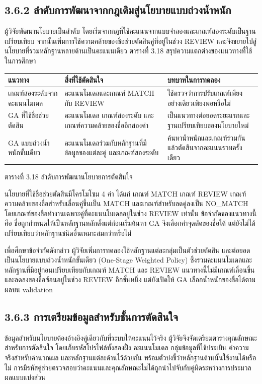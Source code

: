 \subsection*{3.6.2 ลำดับการพัฒนาจากกฎเดิมสู่นโยบายแบบถ่วงน้ำหนัก}
ผู้วิจัยพัฒนานโยบายเป็นลำดับ โดยเริ่มจากกฎที่ใช้คะแนนจากแบบจำลองและเกณฑ์สองระดับเป็นฐานเปรียบเทียบ จากนั้นเพิ่มการใช้ความคล้ายของชื่อช่วยตัดสินคู่ที่อยู่ในช่วง REVIEW และจึงขยายไปสู่นโยบายที่รวมหลักฐานหลายด้านเป็นคะแนนเดียว ตารางที่ 3.18 สรุปความแตกต่างของแนวทางที่ใช้ในการศึกษา

\begin{center}\small
\begin{tabularx}{\linewidth}{p{3.4cm}XX}
\toprule
แนวทาง & สิ่งที่ใช้ตัดสินใจ & บทบาทในการทดลอง \\
\midrule
เกณฑ์สองระดับจากคะแนนโมเดล & คะแนนโมเดลและเกณฑ์ MATCH กับ REVIEW & ใช้ตรวจว่าการปรับเกณฑ์เพียงอย่างเดียวเพียงพอหรือไม่ \\
GA ที่ใช้ชื่อช่วยตัดสิน & คะแนนโมเดล เกณฑ์สองระดับ และเกณฑ์ความคล้ายของชื่ออีกสองค่า & เป็นแนวทางต่อยอดระยะแรกและฐานเปรียบเทียบของนโยบายใหม่ \\
GA แบบถ่วงน้ำหนักขั้นเดียว & คะแนนโมเดลร่วมกับหลักฐานที่มีข้อมูลของแต่ละคู่ และเกณฑ์สองระดับ & ค้นหาน้ำหนักและเกณฑ์ร่วมกัน แล้วตัดสินจากคะแนนรวมครั้งเดียว \\
\bottomrule
\end{tabularx}
\par ตารางที่ 3.18 ลำดับการพัฒนานโยบายการตัดสินใจ
\end{center}

นโยบายที่ใช้ชื่อช่วยตัดสินมีโครโมโซม 4 ค่า ได้แก่ เกณฑ์ MATCH เกณฑ์ REVIEW เกณฑ์ความคล้ายของชื่อสำหรับเลื่อนคู่ขึ้นเป็น MATCH และเกณฑ์สำหรับลดคู่ลงเป็น NO\_MATCH โดยเกณฑ์ของชื่อทำงานเฉพาะคู่ที่คะแนนโมเดลอยู่ในช่วง REVIEW เท่านั้น ข้อจำกัดของแนวทางนี้คือ ชื่อถูกกำหนดให้เป็นหลักฐานหลักตั้งแต่ก่อนเริ่มค้นหา GA จึงเลือกค่าจุดตัดของชื่อได้ แต่ยังไม่ได้เปรียบเทียบว่าหลักฐานชนิดอื่นเหมาะสมกว่าหรือไม่

เพื่อศึกษาข้อจำกัดดังกล่าว ผู้วิจัยเพิ่มการทดลองใช้หลักฐานแต่ละกลุ่มเป็นตัวช่วยตัดสิน และต่อยอดเป็นนโยบายแบบถ่วงน้ำหนักขั้นเดียว (One-Stage Weighted Policy) ซึ่งรวมคะแนนโมเดลและหลักฐานที่มีอยู่ก่อนเปรียบเทียบกับเกณฑ์ MATCH และ REVIEW แนวทางนี้ไม่มีเกณฑ์เลื่อนขึ้นและลดลงของชื่อซ้อนอยู่ในช่วง REVIEW อีกชั้นหนึ่ง แต่ยังเปิดให้ GA เลือกน้ำหนักของชื่อได้ตามผลบน validation

\subsection*{3.6.3 การเตรียมข้อมูลสำหรับชั้นการตัดสินใจ}
ข้อมูลสำหรับนโยบายต้องอ้างอิงคู่เดียวกับที่ระบบให้คะแนนไว้จริง ผู้วิจัยจึงจัดเตรียมตารางคุณลักษณะสำหรับการตัดสินใจ โดยเก็บรหัสโปรไฟล์ทั้งสองฝั่ง คะแนนโมเดล กลุ่มข้อมูลที่ใช้ประเมิน ค่าความจริงสำหรับคำนวณผล และหลักฐานแต่ละด้านไว้ด้วยกัน พร้อมตัวบ่งชี้ว่าหลักฐานด้านนั้นใช้งานได้หรือไม่ การมีรหัสคู่ช่วยตรวจสอบว่าคะแนนและคุณลักษณะไม่ได้ถูกนำไปจับกับคู่ผิดระหว่างการประมวลผลแบบแบ่งส่วน

